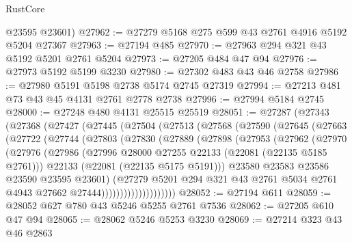 \begin{lexlean}{RustCore}
\begin{coremodule}
      @23595
      @23601)
@27962 := @27279 @5168 @275 @599 @43 @2761 @4916 @5192 @5204 @27367
@27963 := @27194 @485
@27970 := @27963 @294 @321 @43 @5192 @5201 @2761 @5204
@27973 := @27205 @484 @47 @94
@27976 := @27973 @5192 @5199 @3230
@27980 := @27302 @483 @43 @46 @2758
@27986 := @27980 @5191 @5198 @2738 @5174 @2745 @27319
@27994 := @27213 @481 @73 @43 @45 @4131 @2761 @2778 @2738
@27996 := @27994 @5184 @2745
@28000 := @27248 @480 @4131 @25515 @25519
@28051 := @27287
    (@27343
      (@27368
        (@27427
          (@27445
            (@27504
              (@27513
                (@27568
                  (@27590
                    (@27645
                      (@27663
                        (@27722
                          (@27744
                            (@27803
                              (@27830
                                (@27889
                                  (@27898
                                    (@27953
                                      (@27962
                                        (@27970
                                          (@27976
                                            (@27986
                                              (@27996
                                                @28000
                                                @27255
                                                @22133
                                                (@22081 (@22135 @5185 @2761)))
                                              @22133
                                              (@22081 (@22135 @5175 @5191)))
                                            @23580
                                            @23583
                                            @23586
                                            @23590
                                            @23595
                                            @23601)
                                          (@27279
                                            @5201
                                            @294
                                            @321
                                            @43
                                            @2761
                                            @5034
                                            @2761
                                            @4943
                                            @27662
                                            @27444))))))))))))))))))))
@28052 := @27194 @611
@28059 := @28052 @627 @780 @43 @5246 @5255 @2761 @7536
@28062 := @27205 @610 @47 @94
@28065 := @28062 @5246 @5253 @3230
@28069 := @27214 @323 @43 @46 @2863

\end{coremodule}
\end{lexlean}
